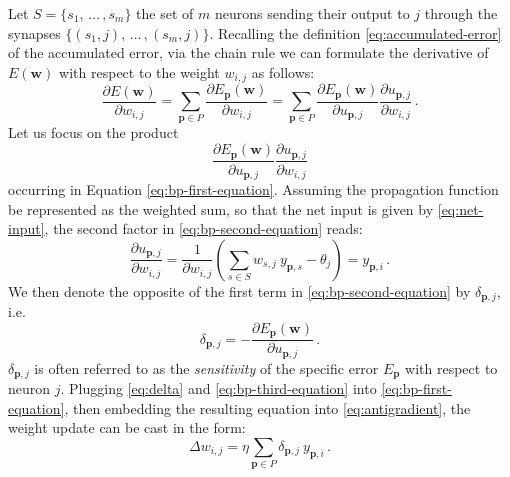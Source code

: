 \documentclass[11pt, a4paper]{report}
\numberwithin{equation}{chapter}
\theoremstyle{theorem}
\theoremstyle{definition}
\numberwithin{figure}{section}
\begin{document}
		Let $S = \lbrace s_1, \, \ldots \, , s_m \rbrace$ the set of $m$ neurons sending their output to $j$ through the synapses $\lbrace (s_1,j), \, \ldots \, , (s_m,j) \rbrace$. Recalling the definition \eqref{eq:accumulated-error} of the accumulated error, via the chain rule we can formulate the derivative of $E(\boldsymbol{w})$ with respect to the weight $w_{i,j}$ as follows:
		\begin{equation}
			\label{eq:bp-first-equation}
			\dfrac{\partial E(\boldsymbol{w})}{\partial w_{i,j}} = \sum_{\boldsymbol{p} \in P} \dfrac{\partial E_{\boldsymbol{p}}(\boldsymbol{w})}{\partial w_{i,j}} = \sum_{\boldsymbol{p} \in P} \dfrac{\partial E_{\boldsymbol{p}}(\boldsymbol{w})}{\partial u_{\boldsymbol{p},j}} \dfrac{\partial u_{\boldsymbol{p},j}}{\partial w_{i,j}} \, .
		\end{equation}
		Let us focus on the product
		\begin{equation}
			\label{eq:bp-second-equation}
			\dfrac{\partial E_{\boldsymbol{p}}(\boldsymbol{w})}{\partial u_{\boldsymbol{p},j}} \dfrac{\partial u_{\boldsymbol{p},j}}{\partial w_{i,j}}
		\end{equation}
		occurring in Equation \eqref{eq:bp-first-equation}. Assuming the propagation function be represented as the weighted sum, so that the net input is given by \eqref{eq:net-input}, the second factor in \eqref{eq:bp-second-equation} reads:
		\begin{equation}
			\label{eq:bp-third-equation}
			\dfrac{\partial u_{\boldsymbol{p},j}}{\partial w_{i,j}} = \dfrac{1}{\partial w_{i,j}} \left( \sum_{s \in S} w_{s,j} ~ y_{\boldsymbol{p},s} - \theta_j \right) = y_{\boldsymbol{p},i} \, .
		\end{equation}
		We then denote the opposite of the first term in \eqref{eq:bp-second-equation} by $\delta_{\boldsymbol{p},j}$, i.e.
		\begin{equation}
			\label{eq:delta}
			\delta_{\boldsymbol{p},j} = - \dfrac{\partial E_{\boldsymbol{p}}(\boldsymbol{w})}{\partial u_{\boldsymbol{p},j}} \, .
		\end{equation} 
		$\delta_{\boldsymbol{p},j}$ is often referred to as the \emph{sensitivity} of the specific error $E_{\boldsymbol{p}}$ with respect to neuron $j$. Plugging \eqref{eq:delta} and \eqref{eq:bp-third-equation} into \eqref{eq:bp-first-equation}, then embedding the resulting equation into \eqref{eq:antigradient}, the weight update can be cast in the form:
		\begin{equation}
			\label{eq:bp-weight-update}
			\Delta w_{i,j} = \eta \sum_{\boldsymbol{p} \in P} \delta_{\boldsymbol{p},j} ~ y_{\boldsymbol{p},i} \, .
		\end{equation}
\end{document}
